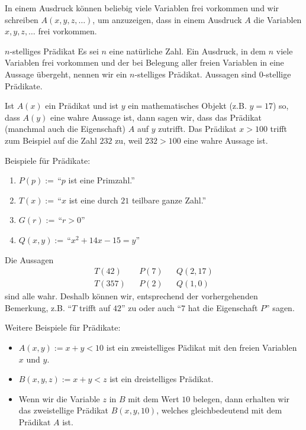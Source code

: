 \begin{remark}
    In einem Ausdruck können beliebig viele Variablen frei vorkommen und wir schreiben $A(x,y,z,\dots)$, um anzuzeigen, dass in einem Ausdruck $A$ die Variablen $x,y,z,\dots$ frei vorkommen.
\end{remark}

\begin{definition}{$n$-stelliges Prädikat}
    Es sei $n$ eine natürliche Zahl. Ein Ausdruck, in dem $n$ viele Variablen frei vorkommen und der bei Belegung aller freien Variablen in eine Aussage übergeht, nennen wir ein $n$-stelliges Prädikat. Aussagen sind $0$-stellige Prädikate.
\end{definition}

\begin{remark}
    Ist $A(x)$ ein Prädikat und ist $y$ ein mathematisches Objekt (z.B. $y=17$) so, dass $A(y)$ eine wahre Aussage ist, dann sagen wir, dass das Prädikat (manchmal auch die Eigenschaft) $A$ auf $y$ zutrifft. Das Prädikat $x>100$ trifft zum Beispiel auf die Zahl $232$ zu, weil $232>100$ eine wahre Aussage ist.
\end{remark}

\begin{example}
    Beispiele für Prädikate:
    \begin{enumerate}
        \item $P(p):= $\,``$p$ ist eine Primzahl.''
        \item $T(x):= $\,``$x$ ist eine durch $21$ teilbare ganze Zahl.''
        \item $G(r):= $\,``$r>0$''
        \item $Q(x,y):= $\,``$x^2+14x-15=y$''
    \end{enumerate}
    Die Aussagen
    \begin{align*}
        &T(42)& 	    &P(7)&		&Q(2,17)&\\
        &T(357)&  &P(2)& 	&Q(1,0)&
    \end{align*}
    sind alle wahr. Deshalb können wir, entsprechend der vorhergehenden Bemerkung, z.B. ``$T$ trifft auf $42$'' zu oder auch ``$7$ hat die Eigenschaft $P$'' sagen.
\end{example}

\begin{example}
    Weitere Beispiele für Prädikate:
    \begin{itemize}
        \item $A(x,y) := x + y < 10$ ist ein zweistelliges Pädikat mit den freien Variablen $x$ und $y$.
        \item $B(x,y,z) := x + y < z$ ist ein dreistelliges Prädikat.
        \item Wenn wir die Variable $z$ in $B$ mit dem Wert $10$ belegen, dann erhalten wir das zweistellige Prädikat $B(x,y,10)$, welches gleichbedeutend mit dem Prädikat $A$ ist.
    \end{itemize}
\end{example}

